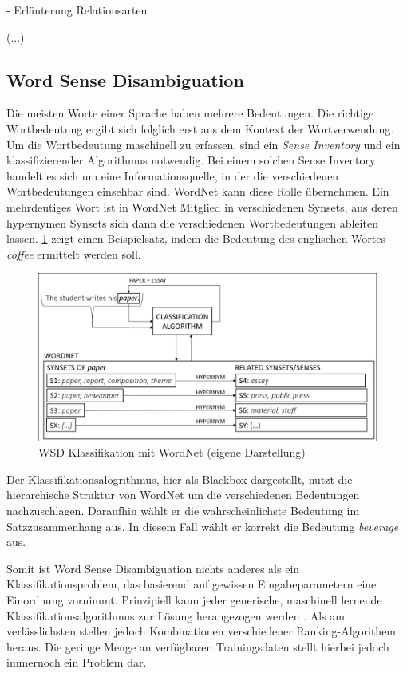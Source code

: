 - Erläuterung Relationsarten

(...)



\par
\subsection{Word Sense Disambiguation}

Die meisten Worte einer Sprache haben mehrere Bedeutungen. Die richtige Wortbedeutung ergibt sich folglich erst aus dem Kontext der Wortverwendung. Um die Wortbedeutung maschinell zu erfassen, sind ein \textit{Sense Inventory} und ein klassifizierender Algorithmus notwendig. Bei einem solchen Sense Inventory handelt es sich um eine Informationsquelle, in der die verschiedenen Wortbedeutungen einsehbar sind. WordNet kann diese Rolle übernehmen. Ein mehrdeutiges Wort ist in WordNet Mitglied in verschiedenen Synsets, aus deren hypernymen Synsets sich dann die verschiedenen Wortbedeutungen ableiten lassen. \ref{fig:WSD} zeigt einen Beispielsatz, indem die Bedeutung des englischen Wortes \textit{coffee} ermittelt werden soll.
\par 

\begin{figure}
\includegraphics[width=15cm]{pictures/WSD.png}
\caption{WSD Klassifikation mit WordNet (eigene Darstellung)}
\label{fig:WSD}
\end{figure}

\par
Der Klassifikationsalogrithmus, hier als Blackbox dargestellt, nutzt die hierarchische Struktur von WordNet um die verschiedenen Bedeutungen nachzuschlagen. Daraufhin wählt er die wahrscheinlichste Bedeutung im Satzzusammenhang aus. In diesem Fall wählt er korrekt die Bedeutung \textit{beverage} aus.
\par
Somit ist Word Sense Disambiguation nichts anderes als ein Klassifikationsproblem, das basierend auf gewissen Eingabeparametern eine Einordnung vornimmt. Prinzipiell kann jeder generische, maschinell lernende Klassifikationsalgorithmus zur Lösung herangezogen werden \cite[vgl.][326]{YAROWSKY}. Als am verlässlichsten stellen jedoch Kombinationen verschiedener Ranking-Algorithem heraus. Die geringe Menge an verfügbaren Trainingsdaten stellt hierbei jedoch immernoch ein Problem dar.


